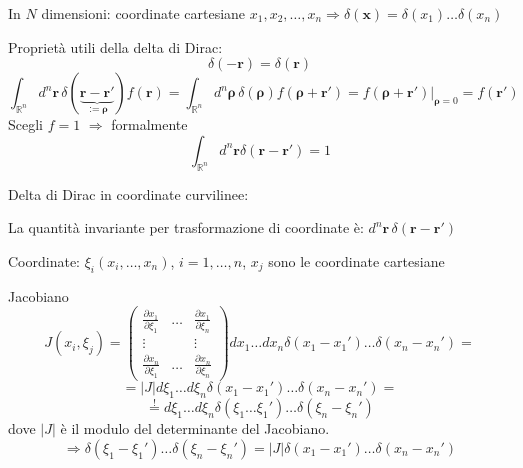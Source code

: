 \documentclass[a4paper,11pt]{report}
\newcommand{\vect}[1]{\boldsymbol{#1}}
\newcommand{\R}{\mathbb{R}}
\newcommand{\x}{\boldsymbol{x}}
\begin{document}
\medskip

In $N$ dimensioni: coordinate cartesiane $x_1,x_2,\dots,x_n \Rightarrow \delta(\x)= \delta(x_1)\dots \delta(x_n)$

\medspace

Propriet\`a utili della delta di Dirac:
\[
\delta(-\vect{r})=\delta(\vect{r})
\]
\begin{equation}
\int_{\R^n} d^n\vect{r}\,\delta(\underbrace{\vect{r}-\vect{r}'}_{:=\vect{\rho}})f(\vect{r}) =
\int_{\R^n}d^n\vect{\rho}\,\delta(\vect{\rho})f(\vect{\rho}+\vect{r}')=
f(\vect{\rho}+\vect{r}')\Big |_{ \vect{\rho}=0}  = f(\vect{r}')
\label{1.7}
\end{equation}
Scegli $f=1$ $\Rightarrow$ formalmente 
\begin{equation}
\int_{\R^n}d^n\vect{r}\delta(\vect{r}-\vect{r}')=1
\end{equation}

\medspace

Delta di Dirac in coordinate curvilinee:

La quantit\`a invariante per trasformazione di coordinate \`e: $d^n\vect{r}\,\delta(\vect{r}-\vect{r}')$

Coordinate: $\xi_i (x_i,\dots,x_n)$, $i=1,\dots,n$, $x_j$ sono le coordinate cartesiane

Jacobiano
\[
J(x_i,\xi_j)=\left(\begin{matrix}
\frac{\partial x_1}{\partial \xi_1} & \dots & \frac{\partial x_1}{\partial \xi_n}\\
\vdots & & \vdots \\
\frac{\partial x_n}{\partial \xi_1} & \dots &\frac{\partial x_n}{\partial \xi_n}
\end{matrix}\right)dx_1\dots dx_n \delta(x_1-x_1')\dots \delta(x_n - x_n')=
\]
\[
=|J|d\xi_1\dots d\xi_n \delta(x_1 - x_1')\dots \delta(x_n-x_n')=
\]
\[
\overset{!}{=}d\xi_1 \dots d\xi_n\delta(\xi_1\dots \xi_1')\dots \delta(\xi_n - \xi_n')
\]
dove $|J|$ \`e il modulo del determinante del Jacobiano.
\begin{equation}
\Rightarrow\delta(\xi_1-\xi_1')\dots\delta(\xi_n-\xi_n')=|J|\delta(x_1-x_1')\dots\delta(x_n-x_n')
\end{equation}
\end{document}

